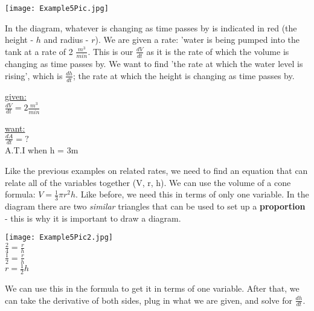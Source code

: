 \documentclass[12pt,fleqn]{book} %
\begin{document}
\begin{center}
    \texttt{[image: Example5Pic.jpg]}
\end{center}

\noindent In the diagram, whatever is changing as time passes by is indicated in red (the height - $h$ and radius - $r$). We are given a rate: 'water is being pumped into the tank at a rate of 2
$\frac{m^3}{min}$. This is our $\frac{dV}{dt}$ as it is the rate of which the volume is changing as time passes by. We want to find 'the rate at which the water level is rising', which is
$\frac{dh}{dt}$; the rate at which the height is changing as time passes by.

\begin{multicols}{2}
    \begin{center}
        \underline{given:} \\
        $\frac{dV}{dt}=2\frac{m^3}{min}$

        \columnbreak
        \underline{want:} \\
        \vspace*{1mm}
        $\frac{dA}{dt}=?$ \\
        \vspace*{1mm}
        {\small A.T.I when h = 3m}
    \end{center}
\end{multicols}

\noindent Like the previous examples on related rates, we need to find an equation that can relate all of the variables together (V, r, h). We can use the volume of a cone formula: $V=\frac{1}{3} \pi r^2h$.
Like before, we need this in terms of only one variable. In the diagram there are two \emph{similar} triangles that can be used to set up a \textbf{proportion} - this is why it is important to draw a diagram.

\begin{center}
    \texttt{[image: Example5Pic2.jpg]} \\
    \vspace*{2mm}
    $\frac{2}{4}=\frac{r}{h}$ \\
    \vspace*{1mm}
    $\frac{1}{2}=\frac{r}{h}$ \\
    \vspace*{1mm}
    $r=\frac{1}{2}h$
\end{center}

\pagebreak

\noindent We can use this in the formula to get it in terms of one variable. After that, we can take the derivative of both sides, plug in what we are given, and solve for $\frac{dh}{dt}$.
\end{document}

